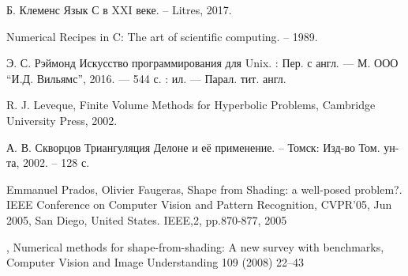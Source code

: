 \begin{thebibliography}{99}
 {Б. Клеменс} Язык С в XXI веке. – Litres, 2017.

 Numerical Recipes in C: The art of scientific
  computing. – 1989.
  
 {Э. С. Рэймонд} Искусство программирования для Unix. :
  Пер. с англ. --- М. ООО ``И.Д. Вильямс'', 2016. --- 544 с. : ил. ---
  Парал. тит. англ.

 {R. J. Leveque}, Finite Volume Methods for Hyperbolic
  Problems, Cambridge University Press, 2002.

 {А. В. Скворцов} Триангуляция Делоне и её применение. –
  Томск: Изд-во Том. ун-та, 2002. – 128 с.

 {Emmanuel Prados, Olivier Faugeras}, Shape from
  Shading: a well-posed problem?. IEEE Conference on Computer Vision
  and Pattern Recognition, CVPR’05, Jun 2005, San Diego, United
  States. IEEE,2, pp.870-877, 2005

,
  Numerical methods for shape-from-shading: A new survey with
  benchmarks, Computer Vision and Image Understanding 109 (2008) 22–43
\end{thebibliography}


